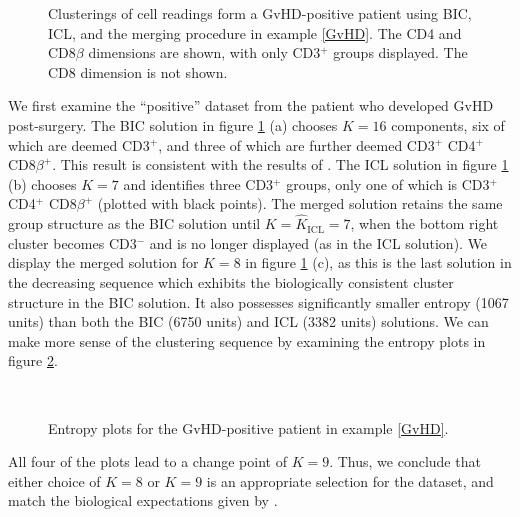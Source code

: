 \documentclass{uwstat572}
\newcommand*\estim[1]{\widehat{#1}}
\renewcommand\;{\,}
\begin{document}
\begin{figure}
\begin{center}
\end{center}
\caption{Clusterings of cell readings form a GvHD-positive patient using BIC, ICL, and the merging procedure in example \ref{GvHD}. The CD4 and CD8$\beta$ dimensions are shown, with only CD3$^+$ groups displayed. The CD8 dimension is not shown.}
\label{positive}
\end{figure}

We first examine the ``positive'' dataset from the patient who developed GvHD post-surgery.
The BIC solution in figure \ref{positive} (a) chooses $K = 16$ components, six of which are deemed CD3$^+$, and three of which are further deemed CD3$^+$ CD4$^+$ CD8$\beta^+$.
This result is consistent with the results of \cite{Brinkman07}.
The ICL solution in figure \ref{positive} (b) chooses $K = 7$ and identifies three CD3$^+$ groups, only one of which is CD3$^+$ CD4$^+$ CD8$\beta^+$ (plotted with black points).
The merged solution retains the same group structure as the BIC solution until $K = \estim K_\text{ICL} = 7$, when the bottom right cluster becomes CD3$^-$ and is no longer displayed (as in the ICL solution).
We display the merged solution for $K = 8$ in figure \ref{positive} (c), as this is the last solution in the decreasing sequence which exhibits the biologically consistent cluster structure in the BIC solution.
It also possesses significantly smaller entropy (1067 units) than both the BIC (6750 units) and ICL (3382 units) solutions.
We can make more sense of the clustering sequence by examining the entropy plots in figure \ref{Entropy5_1}.
\begin{figure}
\begin{center}
\\
\end{center}
\caption{Entropy plots for the GvHD-positive patient in example \ref{GvHD}.}
\label{Entropy5_1}
\end{figure}
All four of the plots lead to a change point of $K = 9$.
Thus, we conclude that either choice of $K = 8$ or $K = 9$ is an appropriate selection for the dataset, and match the biological expectations given by \cite{Brinkman07}.
\end{document}
